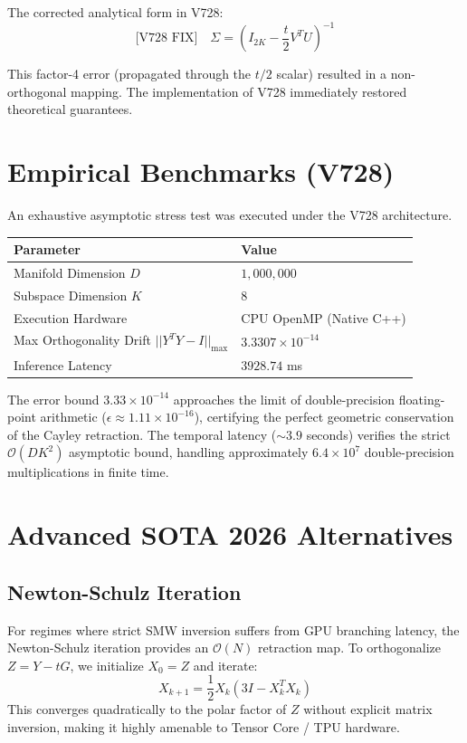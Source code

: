 The corrected analytical form in V728:
\begin{equation*}
\text{[V728 FIX]} \quad \Sigma = \left( I_{2K} - \frac{t}{2} V^T U \right)^{-1}
\end{equation*}

This factor-4 error (propagated through the $t/2$ scalar) resulted in a non-orthogonal mapping. The implementation of V728 immediately restored theoretical guarantees.

\section{Empirical Benchmarks (V728)}

An exhaustive asymptotic stress test was executed under the V728 architecture.


\centering
\begin{tabular}{|l|l|}
\hline
\textbf{Parameter} & \textbf{Value} \\ \hline
Manifold Dimension $D$ & $1,000,000$ \\ \hline
Subspace Dimension $K$ & $8$ \\ \hline
Execution Hardware & CPU OpenMP (Native C++) \\ \hline
Max Orthogonality Drift $||Y^T Y - I||_{\max}$ & $3.3307 \times 10^{-14}$ \\ \hline
Inference Latency & $3928.74$ ms \\ \hline
\end{tabular}



The error bound $3.33 \times 10^{-14}$ approaches the limit of double-precision floating-point arithmetic ($\epsilon \approx 1.11 \times 10^{-16}$), certifying the perfect geometric conservation of the Cayley retraction. The temporal latency ($\sim 3.9$ seconds) verifies the strict $\mathcal{O}(DK^2)$ asymptotic bound, handling approximately $6.4 \times 10^7$ double-precision multiplications in finite time.

\section{Advanced SOTA 2026 Alternatives}

\subsection{Newton-Schulz Iteration}
For regimes where strict SMW inversion suffers from GPU branching latency, the Newton-Schulz iteration provides an $\mathcal{O}(N)$ retraction map. To orthogonalize $Z = Y - tG$, we initialize $X_0 = Z$ and iterate:
\begin{equation}
X_{k+1} = \frac{1}{2} X_k (3 I - X_k^T X_k)
\end{equation}
This converges quadratically to the polar factor of $Z$ without explicit matrix inversion, making it highly amenable to Tensor Core / TPU hardware.

